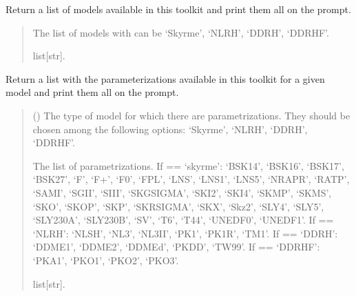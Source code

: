 \documentclass[letterpaper,10pt,english]{sphinxmanual}
\begin{document}
\begin{fulllineitems}
\label{\detokenize{source/api/setup_eos_pheno:nucleardatapy.setup_eos_pheno.eos_pheno_models}}
\pysigstartsignatures
\pysiglinewithargsret
{}
{}
{}
\pysigstopsignatures
\sphinxAtStartPar
Return a list of models available in this toolkit and print them all on the prompt.
\begin{quote}\begin{description}
\sphinxAtStartPar
The list of models with can be ‘Skyrme’, ‘NLRH’, ‘DDRH’, ‘DDRHF’.

\sphinxAtStartPar
list{[}str{]}.

\end{description}\end{quote}

\end{fulllineitems}


\begin{fulllineitems}
\label{\detokenize{source/api/setup_eos_pheno:nucleardatapy.setup_eos_pheno.eos_pheno_params}}
\pysigstartsignatures
\pysiglinewithargsret
{}
{}
{}
\pysigstopsignatures
\sphinxAtStartPar
Return a list with the parameterizations available in
this toolkit for a given model and print them all on the prompt.
\begin{quote}\begin{description}
\sphinxAtStartPar
{} () \textendash{} The type of model for which there are parametrizations.     They should be chosen among the following options: ‘Skyrme’, ‘NLRH’,     ‘DDRH’, ‘DDRHF’.

\sphinxAtStartPar
The list of parametrizations.     If  == ‘skyrme’: ‘BSK14’,     ‘BSK16’, ‘BSK17’, ‘BSK27’, ‘F\sphinxhyphen{}’, ‘F+’, ‘F0’, ‘FPL’, ‘LNS’, ‘LNS1’, ‘LNS5’,     ‘NRAPR’, ‘RATP’, ‘SAMI’, ‘SGII’, ‘SIII’, ‘SKGSIGMA’, ‘SKI2’, ‘SKI4’, ‘SKMP’,     ‘SKMS’, ‘SKO’, ‘SKOP’, ‘SKP’, ‘SKRSIGMA’, ‘SKX’, ‘Skz2’, ‘SLY4’, ‘SLY5’,     ‘SLY230A’, ‘SLY230B’, ‘SV’, ‘T6’, ‘T44’, ‘UNEDF0’, ‘UNEDF1’.     If  == ‘NLRH’: ‘NL\sphinxhyphen{}SH’, ‘NL3’, ‘NL3II’, ‘PK1’, ‘PK1R’, ‘TM1’.     If  == ‘DDRH’: ‘DDME1’, ‘DDME2’, ‘DDMEd’, ‘PKDD’, ‘TW99’.     If  == ‘DDRHF’: ‘PKA1’, ‘PKO1’, ‘PKO2’, ‘PKO3’.

\sphinxAtStartPar
list{[}str{]}.

\end{description}\end{quote}

\end{fulllineitems}
\end{document}
